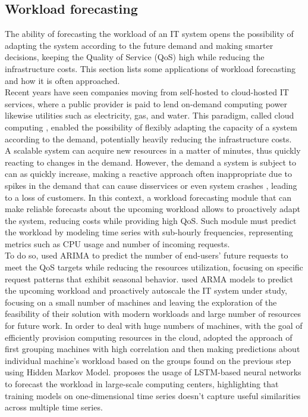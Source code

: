 \documentclass[a4paper]{article} %
\begin{document}
	\subsection{ Workload forecasting } \label{ssec:workload_forecasting}
	The ability of forecasting the workload of an IT system opens the possibility of adapting the system according to the future demand and making smarter decisions, keeping the Quality of Service (QoS) high while reducing the infrastructure costs. This section lists some applications of workload forecasting and how it is often approached.\\
	Recent years have seen companies moving from self-hosted to cloud-hosted  IT services, where a public provider is paid to lend on-demand computing power likewise utilities such as electricity, gas, and water. This paradigm, called cloud computing \cite{CloudComputing}, enabled the possibility of flexibly adapting the capacity of a system according to the demand, potentially heavily reducing the infrastructure costs. \\
	A scalable system can acquire new resources in a matter of minutes, thus quickly reacting to changes in the demand. However, the demand a system is subject to can as quickly increase, making a reactive approach often inappropriate due to spikes in the demand that can cause disservices or even system crashes \cite{ArimaWorkloadPrediction}, leading to a loss of customers. In this context, a workload forecasting module that can make reliable forecasts about the upcoming workload allows to proactively adapt the system, reducing costs while providing high QoS. Such module must predict the workload by modeling time series with sub-hourly frequencies, representing metrics such as CPU usage and number of incoming requests.\\
	To do so, \cite{ArimaWorkloadPrediction} used ARIMA to predict the number of end-users' future requests to meet the QoS targets while reducing the resources utilization, focusing on specific request patterns that exhibit seasonal behavior. \cite{ArmaAutoscaling} used ARMA models to predict the upcoming workload and proactively autoscale the IT system under study, focusing on a small number of machines and leaving the exploration of the feasibility of their solution with modern workloads and large number of resources for future work.
	In order to deal with huge numbers of machines, with the goal of efficiently provision computing resources in the cloud, \cite{WorkloadCharacterizationAndPrediction} adopted the approach of first grouping machines with high correlation and then making predictions about individual machine's workload based on the groups found on the previous step using Hidden Markov Model. 
	\cite{LSTMLargeScaleWorkloadForecasting} proposes the usage of LSTM-based neural networks to forecast the workload in large-scale computing centers, highlighting that training models on one-dimensional time series doesn't capture useful similarities across multiple time series. 
	
\end{document}
